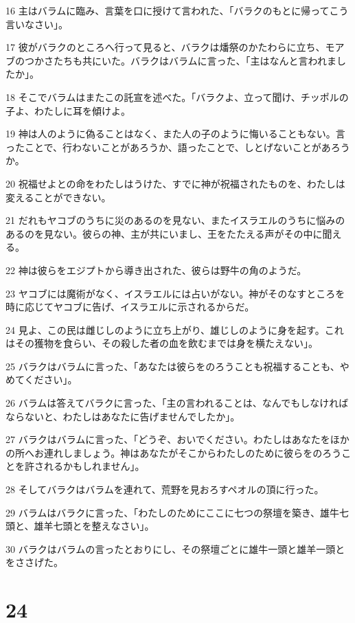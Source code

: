 \par 16 主はバラムに臨み、言葉を口に授けて言われた、「バラクのもとに帰ってこう言いなさい」。
\par 17 彼がバラクのところへ行って見ると、バラクは燔祭のかたわらに立ち、モアブのつかさたちも共にいた。バラクはバラムに言った、「主はなんと言われましたか」。
\par 18 そこでバラムはまたこの託宣を述べた。「バラクよ、立って聞け、チッポルの子よ、わたしに耳を傾けよ。
\par 19 神は人のように偽ることはなく、また人の子のように悔いることもない。言ったことで、行わないことがあろうか、語ったことで、しとげないことがあろうか。
\par 20 祝福せよとの命をわたしはうけた、すでに神が祝福されたものを、わたしは変えることができない。
\par 21 だれもヤコブのうちに災のあるのを見ない、またイスラエルのうちに悩みのあるのを見ない。彼らの神、主が共にいまし、王をたたえる声がその中に聞える。
\par 22 神は彼らをエジプトから導き出された、彼らは野牛の角のようだ。
\par 23 ヤコブには魔術がなく、イスラエルには占いがない。神がそのなすところを時に応じてヤコブに告げ、イスラエルに示されるからだ。
\par 24 見よ、この民は雌じしのように立ち上がり、雄じしのように身を起す。これはその獲物を食らい、その殺した者の血を飲むまでは身を横たえない」。
\par 25 バラクはバラムに言った、「あなたは彼らをのろうことも祝福することも、やめてください」。
\par 26 バラムは答えてバラクに言った、「主の言われることは、なんでもしなければならないと、わたしはあなたに告げませんでしたか」。
\par 27 バラクはバラムに言った、「どうぞ、おいでください。わたしはあなたをほかの所へお連れしましょう。神はあなたがそこからわたしのために彼らをのろうことを許されるかもしれません」。
\par 28 そしてバラクはバラムを連れて、荒野を見おろすペオルの頂に行った。
\par 29 バラムはバラクに言った、「わたしのためにここに七つの祭壇を築き、雄牛七頭と、雄羊七頭とを整えなさい」。
\par 30 バラクはバラムの言ったとおりにし、その祭壇ごとに雄牛一頭と雄羊一頭とをささげた。

\chapter{24}


